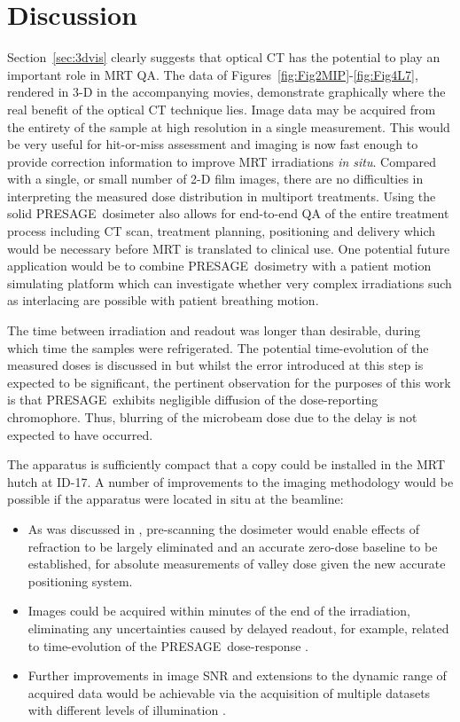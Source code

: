 \documentclass[12pt]{article}
\begin{document}
\section{Discussion}
Section~\ref{sec:3dvis} clearly suggests that optical CT has the potential to play an important role in MRT QA. The data of Figures~\ref{fig:Fig2MIP}-\ref{fig:Fig4L7}, rendered in 3-D in the accompanying movies, demonstrate graphically where the real benefit of the optical CT technique lies. Image data may be acquired from the entirety of the sample at high resolution in a single measurement. This would be very useful for hit-or-miss assessment and imaging is now fast enough to provide correction information to improve MRT irradiations \textit{in situ}. Compared with a single, or small number of 2-D film images, there are no difficulties in interpreting the measured dose distribution in multiport treatments. Using the solid PRESAGE\textregistered \ dosimeter also allows for end-to-end QA of the entire treatment process including CT scan, treatment planning, positioning and delivery which would be necessary before MRT is translated to clinical use. One potential future application would be to combine PRESAGE\textregistered \ dosimetry with a patient motion simulating platform which can investigate whether very complex irradiations such as interlacing are possible with patient breathing motion. 

The time between irradiation and readout was longer than desirable, during which time the samples were refrigerated. The potential time-evolution of the measured doses is discussed in \cite{doranestablishing2013} but whilst the error introduced at this step is expected to be significant, the pertinent observation for the purposes of this work is that PRESAGE\textregistered \ exhibits negligible diffusion of the dose-reporting chromophore. Thus, blurring of the microbeam dose due to the delay is not expected to have occurred.
 
The apparatus is sufficiently compact that a copy could be installed in the MRT hutch at ID-17. A number of improvements to the imaging methodology would be possible if the apparatus were located in situ at the beamline:
\begin{itemize}
	\item As was discussed in \cite{doranestablishing2013}, pre-scanning the dosimeter would enable effects of refraction to be largely eliminated and an accurate zero-dose baseline to be established, for absolute measurements of valley dose given the new accurate positioning system.
	\item Images could be acquired within minutes of the end of the irradiation, eliminating any uncertainties caused by delayed readout, for example, related to time-evolution of the PRESAGE\textregistered \ dose-response \cite{skyttemperature2011 , skyttemperature2012}.   
	\item Further improvements in image SNR and extensions to the dynamic range of acquired data would be achievable via the acquisition of multiple datasets with different levels of illumination \cite{krstajiccharacterization2007 , thomasa2011}.
\end{itemize}
\end{document}
